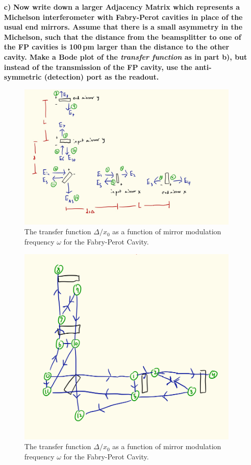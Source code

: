 \documentclass[11pt]{article}
\begin{document}
\begin{enumerate}
\begin{itemize}
\item[\bf c)] {\bf Now write down a larger Adjacency Matrix which represents a Michelson interferometer with Fabry-Perot cavities in place of the usual end mirrors. Assume that there is a small asymmetry in the Michelson, such that the distance from the beamsplitter to one of the FP cavities is 100\,pm larger than the distance to the other cavity.
Make a Bode plot of the \emph{transfer function} as in part b), but instead of the transmission of the FP cavity, use the anti-symmetric (detection) port as the readout.}

\begin{figure}[t]
\includegraphics[width =1\columnwidth]{Michelson}
\caption{The transfer function $\Delta /x_0$ as a function of mirror modulation frequency $\omega$ for the Fabry-Perot Cavity.
}
\label{fig:Michelson}
\end{figure}

\begin{figure}[t]
\includegraphics[width =1\columnwidth]{Michelsongraph}
\caption{The transfer function $\Delta /x_0$ as a function of mirror modulation frequency $\omega$ for the Fabry-Perot Cavity.
}
\label{fig:Michelsongraph}
\end{figure}


\end{itemize}
\end{enumerate}
\end{document}
